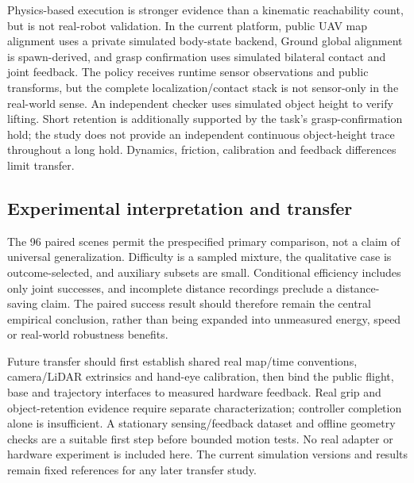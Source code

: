 Physics-based execution is stronger evidence than a kinematic reachability
count, but is not real-robot validation. In the current platform, public UAV
map alignment uses a private simulated body-state backend, Ground global
alignment is spawn-derived, and grasp confirmation uses simulated bilateral
contact and joint feedback. The policy receives runtime sensor observations
and public transforms, but the complete localization/contact stack is not
sensor-only in the real-world sense. An independent checker uses simulated
object height to verify lifting. Short retention is additionally supported by
the task's grasp-confirmation hold; the study does not provide an independent
continuous object-height trace throughout a long hold. Dynamics, friction,
calibration and feedback differences limit transfer.

\subsection{Experimental interpretation and transfer}
The 96 paired scenes permit the prespecified primary comparison, not a claim
of universal generalization. Difficulty is a sampled mixture, the qualitative
case is outcome-selected, and auxiliary subsets are small. Conditional
efficiency includes only joint successes, and incomplete distance recordings
preclude a distance-saving claim. The paired success result should therefore
remain the central empirical conclusion, rather than being expanded into
unmeasured energy, speed or real-world robustness benefits.

Future transfer should first establish shared real map/time conventions,
camera/LiDAR extrinsics and hand-eye calibration, then bind the public flight,
base and trajectory interfaces to measured hardware feedback. Real grip and
object-retention evidence require separate characterization; controller
completion alone is insufficient. A stationary sensing/feedback dataset and
offline geometry checks are a suitable first step before bounded motion tests.
No real adapter or hardware experiment is included here. The current simulation
versions and results remain fixed references for any later transfer study.
